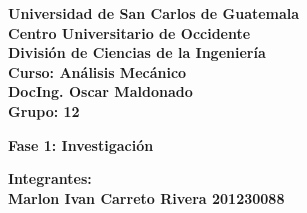 \documentclass[12pt,letterpaper]{article}
\begin{document}
	
	\thispagestyle{empty}
	
	\begin{flushleft}
		\Large %
		\textbf{Universidad de San Carlos de Guatemala}\\
		\textbf{Centro Universitario de Occidente}\\
		\textbf{División de Ciencias de la Ingeniería}\\
		\textbf{Curso: Análisis Mecánico}\\
		\textbf{DocIng. Oscar Maldonado}\\
		\textbf{Grupo: 12}
		
	\end{flushleft}
	
	\vspace*{5cm} 
	
	\begin{center}
		\Huge %
		\textbf{ Fase 1: Investigación}
	\end{center}
	
	\vfill 
	
	\begin{flushright}
		\Large %
		\textbf{Integrantes: \\ Marlon Ivan Carreto Rivera 201230088}
	\end{flushright}
	
	\vspace{1cm}
	
\end{document}

